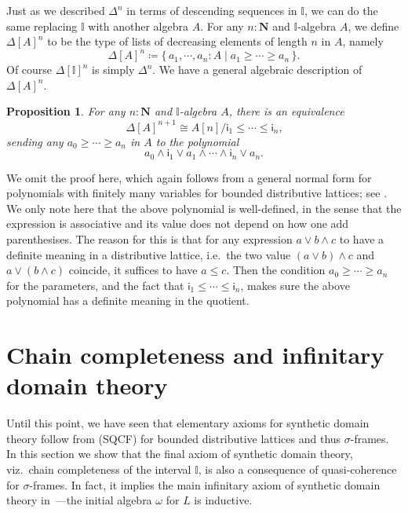 \documentclass[a4paper,12pt]{amsart}
\newtheorem{proposition}[theorem]{Proposition}
\theoremstyle{definition}
\newcommand{\mb}[1]{\mathbf{#1}}
\newcommand{\mbb}[1]{\mathbb{#1}}
\newcommand{\I}{\mbb I}
\newcommand{\ms}[1]{\mathsf{#1}}
\newcommand{\scomp}[2]{\{\,#1\mid#2\,\}}
\newcommand{\N}{\mb N}
\begin{document}
Just as we described $\Delta^n$ in terms of descending sequences in $\I$, we can do the same replacing $\I$ with another algebra $A$.
For any $n : \N$ and $\I$-algebra $A$, we define $\Delta[A]^{n}$ to be the type of lists of decreasing elements of length $n$ in $A$, namely
\[ \Delta[A]^{n} \coloneq \scomp{a_1,\cdots,a_n : A}{a_1 \ge \cdots \ge a_n}\text{.} \]
Of course $\Delta[\I]^n$ is simply $\Delta^n$. We have a general algebraic description of $\Delta[A]^n$.

\begin{proposition}\label{prop:simplicesasalgebra}
  For any $n : \N$ and $\I$-algebra $A$, there is an equivalence 
  \[ \Delta[A]^{n+1} \cong A[n]/\ms{i}_1 \le \cdots \le \ms{i}_n\text{,} \]
  sending any $a_0 \ge \cdots \ge a_n$ in $A$ to the polynomial 
  \[ a_0 \wedge \ms{i}_1 \vee a_1 \wedge \cdots \wedge \ms{i}_n \vee a_n\text{.} \]
\end{proposition}

We omit the proof here, which again follows from a general normal form for polynomials with finitely many variables for bounded distributive lattices; see \citet[Ch.\ 1, Thm.\ 10.21]{lausch2000algebra}. We only note here that the above polynomial is well-defined, in the sense that the expression is associative and its value does not depend on how one add parenthesises. The reason for this is that for any expression $a \vee b \wedge c$ to have a definite meaning in a distributive lattice, i.e.\ the two value $(a \vee b) \wedge c$ and $a \vee (b \wedge c)$ coincide, it suffices to have $a \le c$. Then the condition $a_0 \ge \cdots \ge a_n$ for the parameters, and the fact that $\ms{i}_1 \le \cdots \le \ms{i}_n$, makes sure the above polynomial has a definite meaning in the quotient.


\section{Chain completeness and infinitary domain theory}\label{sec:infdomain}

Until this point, we have seen that elementary axioms for synthetic domain theory follow from (SQCF) for bounded distributive lattices and thus $\sigma$-frames. In this section we show that the final axiom of synthetic domain theory, viz.\ chain completeness of the interval $\I$, is also a consequence of quasi-coherence for $\sigma$-frames. In fact, it implies the main infinitary axiom of synthetic domain theory in~\citet{fiore-plotkin:1996}---the initial algebra $\omega$ for $L$ is inductive.
\end{document}
